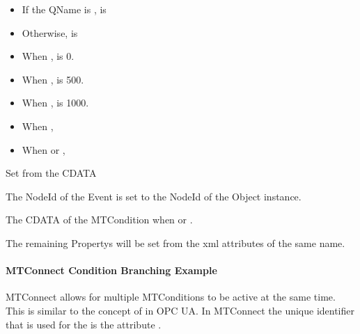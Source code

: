 \begin{description}[font=\it\bfseries,labelindent=4em,labelwidth=6em,leftmargin=!]    
  \item[EnableState]
  \begin{itemize}
    \item If the \gls{QName} is ,  is 
    \item Otherwise,  is 
  \end{itemize}
  \vspace{1em}
  \item[Severity]
  \begin{itemize}
    \item When ,  is 0.
    \item When ,  is 500.
    \item When ,  is 1000.
  \end{itemize}
  \vspace{1em}
  \item[Retain]
  \begin{itemize}
    \item When , 
    \item When  or , 
  \end{itemize}
  \vspace{1em}
  \item[Message] Set from the \gls{CDATA}
  \item[Time] 
  \item[NodeId] The \gls{NodeId} of the \gls{Event} is set to the \gls{NodeId} of the  \gls{Object} instance.
  \item[Message] The \gls{CDATA} of the \gls{MTCondition} when  or .
  \item[\ldots] The remaining \glspl{Property} will be set from the \gls{xml} attributes of the same name.
\end{description}

\paragraph{MTConnect Condition Branching Example}

MTConnect allows for multiple \glspl{MTCondition} to be active at the same time. This is similar to the concept of  in OPC UA. In MTConnect the unique identifier that is used for the  is the attribute .

